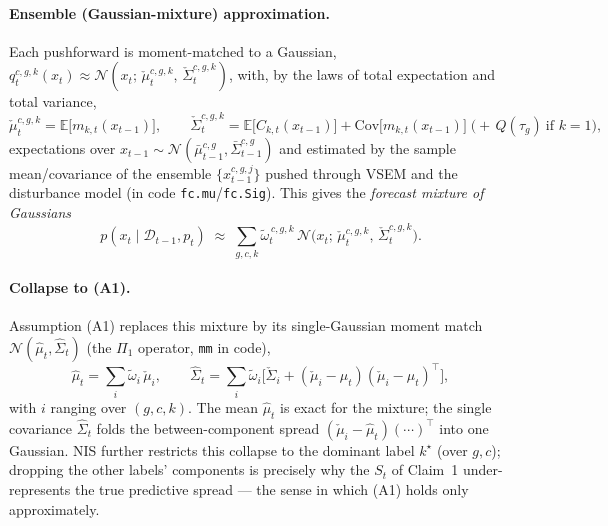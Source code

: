 \documentclass{article}
\newcommand{\E}{\mathbb{E}}
\newcommand{\Norm}{\mathcal{N}}
\begin{document}
\paragraph{Ensemble (Gaussian-mixture) approximation.} Each pushforward is moment-matched to a
Gaussian, $q^{c,g,k}_t(x_t) \approx \Norm(x_t;\, \check\mu^{c,g,k}_t,\, \check\Sigma^{c,g,k}_t)$,
with, by the laws of total expectation and total variance,
\[
  \check\mu^{c,g,k}_t = \E\!\big[m_{k,t}(x_{t-1})\big],
  \qquad
  \check\Sigma^{c,g,k}_t = \E\!\big[C_{k,t}(x_{t-1})\big] + \mathrm{Cov}\!\big[m_{k,t}(x_{t-1})\big]
  \;\big(+\, Q(\tau_g)\ \text{if } k=1\big),
\]
expectations over $x_{t-1}\sim\Norm(\bar\mu^{c,g}_{t-1},\bar\Sigma^{c,g}_{t-1})$ and estimated by
the sample mean/covariance of the ensemble $\{x^{c,g,j}_{t-1}\}$ pushed through VSEM and the
disturbance model (in code \lstinline{fc.mu}/\lstinline{fc.Sig}). This gives the \emph{forecast
mixture of Gaussians}
\[
  p(x_t \mid \mathcal{D}_{t-1}, p_t)
  \;\approx\; \sum_{g,c,k} \tilde\omega^{\,c,g,k}_t\,
  \Norm\!\big(x_t;\, \check\mu^{c,g,k}_t,\, \check\Sigma^{c,g,k}_t\big).
\]

\paragraph{Collapse to (A1).} Assumption (A1) replaces this mixture by its single-Gaussian
moment match $\Norm(\hat\mu_t,\hat\Sigma_t)$ (the $\Pi_1$ operator, \lstinline{mm} in code),
\[
  \hat\mu_t = \sum_i \tilde\omega_i\, \check\mu_i,
  \qquad
  \hat\Sigma_t = \sum_i \tilde\omega_i\Big[\check\Sigma_i
     + (\check\mu_i - \hat\mu_t)(\check\mu_i - \hat\mu_t)^\top\Big],
\]
with $i$ ranging over $(g,c,k)$. The mean $\hat\mu_t$ is exact for the mixture; the single
covariance $\hat\Sigma_t$ folds the between-component spread $(\check\mu_i-\hat\mu_t)(\cdots)^\top$
into one Gaussian. NIS further restricts this collapse to the dominant label $k^\star$ (over
$g,c$); dropping the other labels' components is precisely why the $S_t$ of Claim~1
under-represents the true predictive spread --- the sense in which (A1) holds only
approximately.
\end{document}
